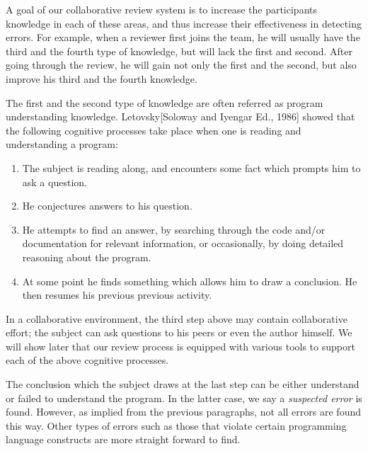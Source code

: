 A goal of our collaborative review system is to increase the participants
knowledge in each of these areas, and thus
increase their effectiveness in detecting errors.
For example, when a reviewer first joins the team, he will usually 
have the third and the fourth type of knowledge, but will lack  the first
and  second.  After going through the review, he
will gain not only the first and the second, but also
improve his third and the fourth knowledge. 

The first and the second type of knowledge are often referred 
as program understanding knowledge.
Letovsky[Soloway and Iyengar Ed., 1986] showed that 
the following cognitive processes take
place when one is reading and understanding a program:
\begin {enumerate}
\item The subject is reading along, and encounters some fact which prompts 
him to ask a question.
\item He conjectures answers to his question.
\item He attempts to find an answer, by searching through the code and/or
documentation for relevant information, or occasionally, by doing 
detailed reasoning about the program.
\item At some point he finds something which allows him to draw a
conclusion.  He then resumes his previous previous activity.
\end {enumerate}

In a collaborative environment, the third step above may contain
collaborative effort; the subject can ask questions to
his peers or even the author himself. We will show later that
our review process is equipped with various tools to support each
of the above cognitive processes.

The conclusion which the subject draws at the last step can
be either understand or failed
to understand the program.  In the latter case, we say a {\it suspected
error} is found.  However, as implied from the previous
paragraphs, not all errors are found this way. Other types of errors
such as those that violate certain programming language constructs are
more straight forward to find.

